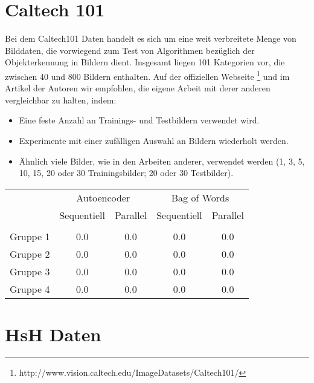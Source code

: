 \section{Caltech 101}

Bei dem Caltech101 Daten handelt es sich um eine weit verbreitete Menge von Bilddaten, die vorwiegend zum Test von Algorithmen bezüglich der Objekterkennung in Bildern dient. Insgesamt liegen 101 Kategorien vor, die zwischen 40 und 800 Bildern enthalten. Auf der offiziellen Webseite \footnote{http://www.vision.caltech.edu/Image\textunderscore Datasets/Caltech101/} und im Artikel der Autoren wir empfohlen, die eigene Arbeit mit derer anderen vergleichbar zu halten, indem:

\begin{itemize}
	\item Eine feste Anzahl an Trainings- und Testbildern verwendet wird.
	\item Experimente mit einer zufälligen Auswahl an Bildern wiederholt werden.
	\item Ähnlich viele Bilder, wie in den Arbeiten anderer, verwendet werden (1, 3, 5, 10, 15, 20 oder 30 Trainingsbilder; 20 oder 30 Testbilder).
\end{itemize}

\begin{center}
    \begin{tabular}{l c c c c}
     		 & \multicolumn{2}{c}{Autoencoder} & \multicolumn{2}{c}{Bag of Words}  \\
    	     & Sequentiell & Parallel 	& Sequentiell  & Parallel  		\\ \hline
    	     															\\[-0.9em] 
    Gruppe 1 & 0.0		   & 0.0		& 0.0		   & 0.0			\\     
    Gruppe 2 & 0.0		   & 0.0		& 0.0		   & 0.0			\\ 
    Gruppe 3 & 0.0		   & 0.0	 	& 0.0		   & 0.0			\\ 
    Gruppe 4 & 0.0		   & 0.0		& 0.0		   & 0.0			\\
    \end{tabular}
\end{center}

\section{HsH Daten}

